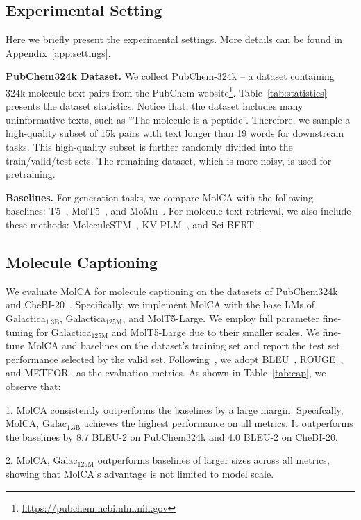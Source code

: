\documentclass[11pt]{article}
\begin{document}
\subsection{Experimental Setting}
Here we briefly present the experimental settings. More details can be found in Appendix~\ref{app:settings}.

\textbf{PubChem324k Dataset.} We collect PubChem-324k -- a dataset containing 324k molecule-text pairs from the PubChem website\footnote{\url{https://pubchem.ncbi.nlm.nih.gov}}. Table~\ref{tab:statistics} presents the dataset statistics. Notice that, the dataset includes many uninformative texts, such as ``The molecule is a peptide''. Therefore, we sample a high-quality subset of 15k pairs with text longer than 19 words for downstream tasks. This high-quality subset is further randomly divided into the train/valid/test sets. The remaining dataset, which is more noisy, is used for pretraining.


\textbf{Baselines.} For generation tasks, we compare MolCA with the following baselines: T5~\cite{T5}, MolT5~\cite{MolT5}, and MoMu~\cite{MoMu}. For molecule-text retrieval, we also include these methods: MoleculeSTM~\cite{MoleculeSTM}, KV-PLM~\cite{KVPLM}, and Sci-BERT~\cite{SciBERT}. 




\subsection{Molecule Captioning}
We evaluate MolCA for molecule captioning on the datasets of PubChem324k and CheBI-20~\cite{MolT5}. Specifically, we implement MolCA with the base LMs of Galactica$_{\text{1.3B}}$, Galactica$_{\text{125M}}$, and MolT5-Large. We employ full parameter fine-tuning for Galactica$_{\text{125M}}$ and MolT5-Large due to their smaller scales. We fine-tune MolCA and baselines on the dataset's training set and report the test set performance selected by the valid set. Following~\cite{MolT5}, we adopt BLEU~\cite{BLEU}, ROUGE~\cite{ROUGE}, and METEOR~\cite{METEOR} as the evaluation metrics. As shown in Table~\ref{tab:cap}, we observe that:

1. MolCA consistently outperforms the baselines by a large margin. Specifcally, MolCA, $\text{Galac}_{\text{1.3B}}$ achieves the highest performance on all metrics. It outperforms the baselines by 8.7 BLEU-2 on PubChem324k and 4.0 BLEU-2 on CheBI-20. 

2. MolCA, $\text{Galac}_{\text{125M}}$ outperforms baselines of larger sizes across all metrics, showing that MolCA's advantage is not limited to model scale.
\end{document}
